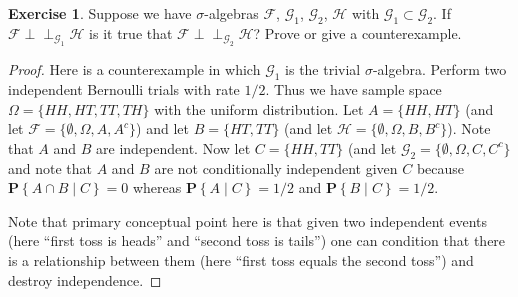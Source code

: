 \documentclass{amsbook}
\theoremstyle{definition}
\newtheorem{xca}{Exercise}
\theoremstyle{remark}
\newcommand{\Independent}{\perp \! \! \! \perp}
\newcommand{\cindependent}[3]{#1 \Independent_{#3} #2}
\newcommand{\cprobability}[2]{\textbf{P} \left \{#2 \mid #1 \right \}}
\begin{document}
\begin{xca}Suppose we have $\sigma$-algebras $\mathcal{F}$,
  $\mathcal{G}_1$, $\mathcal{G}_2$, $\mathcal{H}$ with $\mathcal{G}_1
  \subset \mathcal{G}_2$.  If
  $\cindependent{\mathcal{F}}{\mathcal{H}}{\mathcal{G}_1}$
is it true that $\cindependent{\mathcal{F}}{\mathcal{H}}{\mathcal{G}_2}$?
Prove or give a counterexample.
\end{xca}
\begin{proof}
Here is a counterexample in which $\mathcal{G}_1$ is the trivial
$\sigma$-algebra.  Perform two independent Bernoulli trials with rate
$1/2$.  Thus we have sample space $\Omega = \lbrace HH, HT, TT, TH
\rbrace$ with the uniform distribution.  Let $A = \lbrace HH, HT
\rbrace$ (and let $\mathcal{F} = \lbrace \emptyset, \Omega, A, A^c
\rbrace$) and let $B = \lbrace HT, TT \rbrace$ (and let $\mathcal{H} =
\lbrace \emptyset , \Omega, B, B^c \rbrace$).  Note that $A$ and $B$
are independent.  Now let $C = \lbrace HH, TT \rbrace$ (and let
$\mathcal{G}_2 = \lbrace \emptyset, \Omega, C, C^c \rbrace$ and note
that $A$ and $B$ are not conditionally independent given $C$ because
$\cprobability{C}{A \cap B} = 0$ whereas $\cprobability{C}{A} = 1/2$
and $\cprobability{C}{B} = 1/2$.

Note
that primary conceptual point here is that given two independent
events (here ``first toss is heads'' and ``second toss is tails'') one
can condition that there is a relationship between them (here ``first toss
equals the second toss'') and destroy independence.  
\end{proof}
\end{document}
